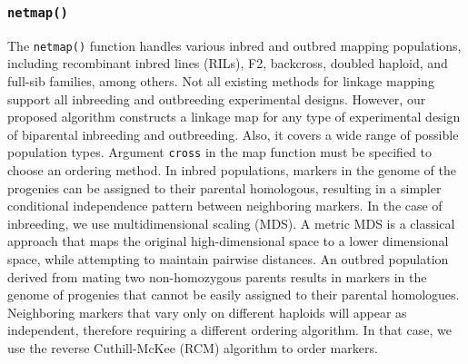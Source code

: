 \subsubsection*{ {\tt netmap()}}
The {\tt netmap()} function handles various inbred and outbred mapping populations, including recombinant inbred lines (RILs), F2, backcross, doubled haploid, and full-sib families, among others. Not all existing methods for linkage mapping support all inbreeding and outbreeding experimental designs. However, our proposed algorithm constructs a linkage map for any type of experimental design of biparental inbreeding and outbreeding.  %
Also, it covers a wide range of possible population types. Argument {\tt cross} in the map function must be specified to choose an ordering method. In inbred populations, markers in the genome of the progenies can be assigned to their parental homologous, resulting in a simpler conditional independence pattern between neighboring markers. In the case of inbreeding, we use multidimensional scaling (MDS). A metric MDS is a classical approach that maps the original high-dimensional space to a lower dimensional space, while attempting to maintain pairwise distances. An outbred population derived from mating two non-homozygous parents results in markers in the genome of progenies that cannot be easily assigned to their parental homologues. Neighboring markers that vary only on different haploids will appear as independent, therefore requiring a different ordering algorithm. In that case, we use the reverse Cuthill-McKee (RCM) algorithm \citep{cuthill1969reducing} to order markers.%

